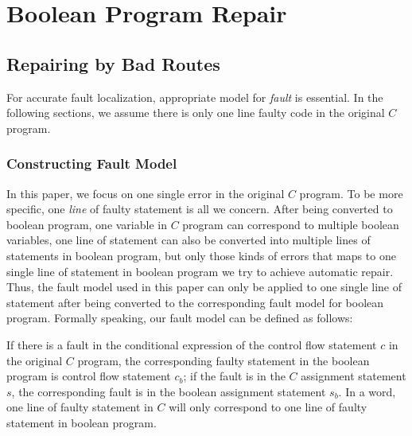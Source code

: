 
\section{Boolean Program Repair}
\label{section:BooleanProgramRepair}
\subsection{Repairing by Bad Routes}
For accurate fault localization, appropriate model for {\it fault} is essential. In the following sections, we assume there is only one line faulty code in the original $C$ program.
\subsubsection{Constructing Fault Model}
In this paper, we focus on one single error in the original $C$ program. To be more specific, one {\it line} of faulty statement is all we concern.
After being converted to boolean program, one variable in $C$ program can correspond to multiple boolean variables, one line of statement can also be converted into multiple lines of statements in boolean program,
but only those kinds of errors that maps to one single line of statement in boolean program we try to achieve automatic repair.
Thus, the fault model used in this paper can only be applied to one single line of statement after being converted to the corresponding fault model for boolean program.
Formally speaking, our fault model can be defined as follows:
\begin{definition}
If there is a fault in the conditional expression of the control flow statement $c$ in the original $C$ program, the corresponding faulty statement in the boolean program is control flow statement $c_{b}$;
if the fault is in the $C$ assignment statement $s$, the corresponding fault is in the boolean assignment statement $s_{b}$.
In a word, one line of faulty statement in $C$ will only correspond to one line of faulty statement in boolean program.
\end{definition}

